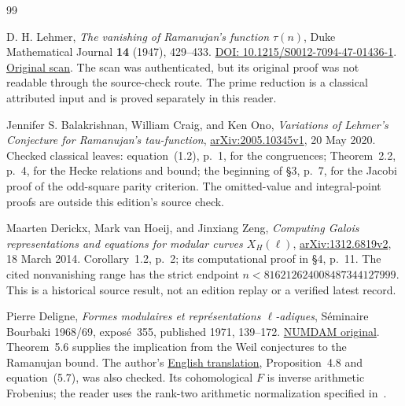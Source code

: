 \begin{thebibliography}{99}
\small
\setlength{\itemsep}{2pt}
\setlength{\parsep}{0pt}
\setlength{\parskip}{0pt}

D. H. Lehmer, \emph{The vanishing of Ramanujan's function $\tau(n)$},
Duke Mathematical Journal \textbf{14} (1947), 429--433.
\href{https://doi.org/10.1215/S0012-7094-47-01436-1}{DOI: 10.1215/S0012-7094-47-01436-1}.
\href{https://oeis.org/A000594/a000594.pdf}{Original scan}.
The scan was authenticated, but its original proof was not readable through the source-check route. The prime reduction is a classical attributed input and is proved separately in this reader.

Jennifer S. Balakrishnan, William Craig, and Ken Ono,
\emph{Variations of Lehmer's Conjecture for Ramanujan's tau-function},
\href{https://arxiv.org/pdf/2005.10345}{arXiv:2005.10345v1}, 20 May 2020.
Checked classical leaves: equation~(1.2), p.~1, for the congruences; Theorem~2.2, p.~4, for the Hecke relations and bound; the beginning of \S3, p.~7, for the Jacobi proof of the odd-square parity criterion. The omitted-value and integral-point proofs are outside this edition's source check.

Maarten Derickx, Mark van Hoeij, and Jinxiang Zeng,
\emph{Computing Galois representations and equations for modular curves $X_H(\ell)$},
\href{https://arxiv.org/pdf/1312.6819v2}{arXiv:1312.6819v2}, 18 March 2014.
Corollary~1.2, p.~2; its computational proof in \S4, p.~11.
The cited nonvanishing range has the strict endpoint
$n<816212624008487344127999$. This is a historical source result, not an edition replay or a verified latest record.

Pierre Deligne, \emph{Formes modulaires et repr\'esentations $\ell$-adiques},
S\'eminaire Bourbaki 1968/69, expos\'e~355, published 1971, 139--172.
\href{https://www.numdam.org/item/SB_1968-1969__11__139_0.pdf}{NUMDAM original}.
Theorem~5.6 supplies the implication from the Weil conjectures to the Ramanujan bound.
The author's \href{https://publications.ias.edu/sites/default/files/5_FormesModulaires.pdf}{English translation}, Proposition~4.8 and equation~(5.7), was also checked.
Its cohomological $F$ is inverse arithmetic Frobenius; the reader uses the rank-two arithmetic normalization specified in~\cite{SerreBourbaki}.


\end{thebibliography}
